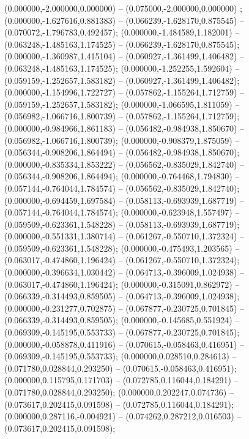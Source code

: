  (0.000000,-2.000000,0.000000) -- (0.075000,-2.000000,0.000000) ;
 (0.000000,-1.627616,0.881383) -- (0.066239,-1.628170,0.875545) -- (0.070072,-1.796783,0.492457);
 (0.000000,-1.484589,1.182001) -- (0.063248,-1.485163,1.174525) -- (0.066239,-1.628170,0.875545);
 (0.000000,-1.360987,1.415104) -- (0.060927,-1.361499,1.406482) -- (0.063248,-1.485163,1.174525);
 (0.000000,-1.252255,1.592604) -- (0.059159,-1.252657,1.583182) -- (0.060927,-1.361499,1.406482);
 (0.000000,-1.154996,1.722727) -- (0.057862,-1.155264,1.712759) -- (0.059159,-1.252657,1.583182);
 (0.000000,-1.066595,1.811059) -- (0.056982,-1.066716,1.800739) -- (0.057862,-1.155264,1.712759);
 (0.000000,-0.984966,1.861183) -- (0.056482,-0.984938,1.850670) -- (0.056982,-1.066716,1.800739);
 (0.000000,-0.908379,1.875059) -- (0.056344,-0.908206,1.864494) -- (0.056482,-0.984938,1.850670);
 (0.000000,-0.835334,1.853222) -- (0.056562,-0.835029,1.842740) -- (0.056344,-0.908206,1.864494);
 (0.000000,-0.764468,1.794830) -- (0.057144,-0.764044,1.784574) -- (0.056562,-0.835029,1.842740);
 (0.000000,-0.694459,1.697584) -- (0.058113,-0.693939,1.687719) -- (0.057144,-0.764044,1.784574);
 (0.000000,-0.623948,1.557497) -- (0.059509,-0.623361,1.548228) -- (0.058113,-0.693939,1.687719);
 (0.000000,-0.551331,1.380714) -- (0.061267,-0.550710,1.372324) -- (0.059509,-0.623361,1.548228);
 (0.000000,-0.475493,1.203565) -- (0.063017,-0.474860,1.196424) -- (0.061267,-0.550710,1.372324);
 (0.000000,-0.396634,1.030442) -- (0.064713,-0.396009,1.024938) -- (0.063017,-0.474860,1.196424);
 (0.000000,-0.315091,0.862972) -- (0.066339,-0.314493,0.859505) -- (0.064713,-0.396009,1.024938);
 (0.000000,-0.231277,0.702875) -- (0.067877,-0.230725,0.701845) -- (0.066339,-0.314493,0.859505);
 (0.000000,-0.145685,0.551924) -- (0.069309,-0.145195,0.553733) -- (0.067877,-0.230725,0.701845);
 (0.000000,-0.058878,0.411916) -- (0.070615,-0.058463,0.416951) -- (0.069309,-0.145195,0.553733);
 (0.000000,0.028510,0.284613) -- (0.071780,0.028844,0.293250) -- (0.070615,-0.058463,0.416951);
 (0.000000,0.115795,0.171703) -- (0.072785,0.116044,0.184291) -- (0.071780,0.028844,0.293250);
 (0.000000,0.202247,0.074736) -- (0.073617,0.202415,0.091598) -- (0.072785,0.116044,0.184291);
 (0.000000,0.287116,-0.004921) -- (0.074262,0.287212,0.016503) -- (0.073617,0.202415,0.091598);
